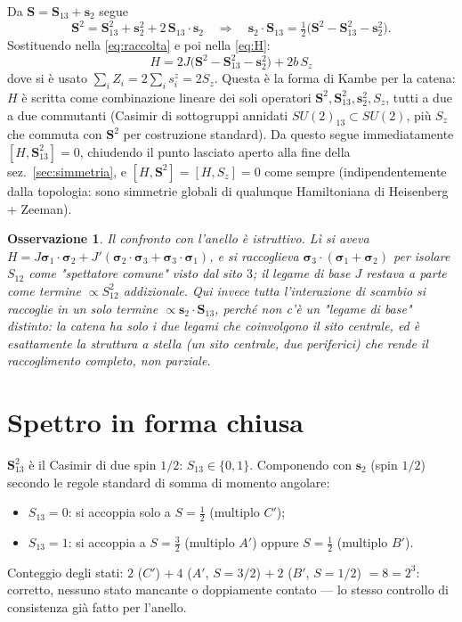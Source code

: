 \documentclass[11pt,a4paper]{article}
\newtheorem{osservazione}{Osservazione}
\begin{document}
Da $\mathbf S=\mathbf S_{13}+\mathbf s_2$ segue
\begin{equation}
\mathbf S^2 = \mathbf S_{13}^2+\mathbf s_2^2+2\,\mathbf S_{13}\cdot\mathbf s_2
\quad\Longrightarrow\quad
\mathbf s_2\cdot\mathbf S_{13}=\tfrac12\big(\mathbf S^2-\mathbf S_{13}^2-\mathbf s_2^2\big).
\label{eq:S2}
\end{equation}
Sostituendo nella \eqref{eq:raccolta} e poi nella \eqref{eq:H}:
\begin{equation}
\boxed{\,H = 2J\big(\mathbf S^2-\mathbf S_{13}^2-\mathbf s_2^2\big) + 2b\,S_z\,}
\label{eq:Hkambe}
\end{equation}
dove si è usato $\sum_i Z_i = 2\sum_i s_i^z = 2S_z$. Questa è la forma di
Kambe per la catena: $H$ è scritta come combinazione lineare dei soli
operatori $\mathbf S^2,\mathbf S_{13}^2,\mathbf s_2^2,S_z$, tutti a due a due
commutanti (Casimir di sottogruppi annidati $SU(2)_{13}\subset SU(2)$, più
$S_z$ che commuta con $\mathbf S^2$ per costruzione standard). Da questo segue
immediatamente $[H,\mathbf S_{13}^2]=0$, chiudendo il punto lasciato aperto
alla fine della sez.~\ref{sec:simmetria}, e $[H,\mathbf S^2]=[H,S_z]=0$ come
sempre (indipendentemente dalla topologia: sono simmetrie globali di
qualunque Hamiltoniana di Heisenberg + Zeeman).

\begin{osservazione}
Il confronto con l'anello è istruttivo. Lì si aveva
$H=J\boldsymbol\sigma_1\!\cdot\!\boldsymbol\sigma_2+J'(\boldsymbol\sigma_2\!\cdot\!\boldsymbol\sigma_3+\boldsymbol\sigma_3\!\cdot\!\boldsymbol\sigma_1)$,
e si raccoglieva $\boldsymbol\sigma_3\cdot(\boldsymbol\sigma_1+\boldsymbol\sigma_2)$ per isolare
$S_{12}$ come "spettatore comune" visto dal sito $3$; il legame di base $J$
restava a parte come termine $\propto S_{12}^2$ addizionale. Qui invece
\emph{tutta} l'interazione di scambio si raccoglie in un solo termine
$\propto \mathbf s_2\cdot\mathbf S_{13}$, perché non c'è un "legame di base"
distinto: la catena ha solo i due legami che coinvolgono il sito centrale,
ed è esattamente la struttura a stella (un sito centrale, due periferici)
che rende il raccoglimento completo, non parziale.
\end{osservazione}

\section{Spettro in forma chiusa}

$\mathbf S_{13}^2$ è il Casimir di due spin $1/2$: $S_{13}\in\{0,1\}$.
Componendo con $\mathbf s_2$ (spin $1/2$) secondo le regole standard di
somma di momento angolare:
\begin{itemize}
\item $S_{13}=0$: si accoppia solo a $S=\tfrac12$ (multiplo $C'$);
\item $S_{13}=1$: si accoppia a $S=\tfrac32$ (multiplo $A'$) oppure $S=\tfrac12$ (multiplo $B'$).
\end{itemize}
Conteggio degli stati: $2$ ($C'$) $+\ 4$ ($A'$, $S=3/2$) $+\ 2$ ($B'$, $S=1/2$)
$=8=2^3$: corretto, nessuno stato mancante o doppiamente contato — lo stesso
controllo di consistenza già fatto per l'anello.
\end{document}
